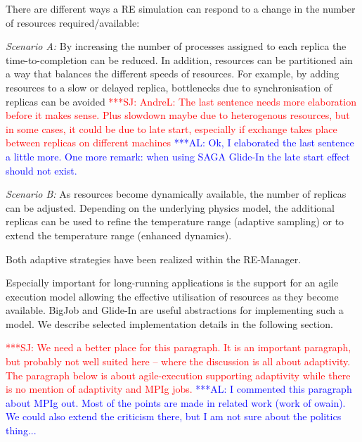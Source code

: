 \documentclass{rspublic}
\newcommand{\alnote}[1]{ {\textcolor{blue} { ***AL: #1 }}}
\newcommand{\jhanote}[1]{ {\textcolor{red} { ***SJ: #1 }}}
\newcommand{\alnote}[1]{}
\newcommand{\jhanote}[1]{}
\begin{document}
There are different ways
a RE simulation can respond to a change in the number of resources
required/available:
\begin{compactitem}         
\item {\it Scenario A:} By increasing the number of processes assigned
  to each replica the time-to-completion can be reduced. In addition,
  resources can be partitioned ain a way that balances the different
  speeds of resources.  For example, by adding resources to a slow or
  delayed replica, bottlenecks due to synchronisation of replicas can
  be avoided
  \jhanote{AndreL: The last sentence needs more elaboration before it
    makes sense. Plus slowdown maybe due to heterogenous resources,
    but in some cases, it could be due to late start, especially if
    exchange takes place between replicas on different machines}
  \alnote{Ok, I elaborated the last sentence a little more. One more
    remark: when using SAGA Glide-In the late start effect should not
    exist.}

\item {\it Scenario B:} As resources become dynamically available, the
  number of replicas can be adjusted. Depending on the underlying
  physics model, the additional replicas can be used to refine the
  temperature range (adaptive sampling) or to extend the temperature
  range (enhanced dynamics).
\end{compactitem}           
Both adaptive strategies have been realized within the RE-Manager.

Especially important for long-running applications is the support for
an agile execution model allowing the effective utilisation of
resources as they become available. BigJob and Glide-In are useful
abstractions for implementing such a model.  We describe selected
implementation details in the following section.


\jhanote{We need a better place for this paragraph. It is an important
  paragraph, but probably not well suited here -- where the discussion
  is all about adaptivity. The paragraph below is about
  agile-execution supporting adaptivity while there is no mention of
  adaptivity and MPIg jobs.}
\alnote{I commented this paragraph about MPIg out. Most of the points are
made in related work (work of owain). We could also extend the criticism
there, but I am not sure about the politics thing...}  
\end{document}
